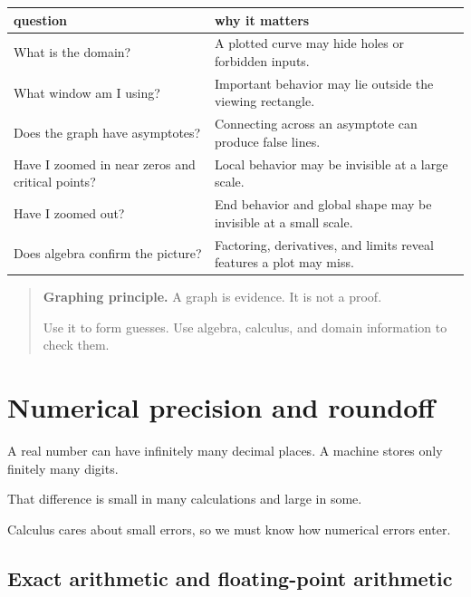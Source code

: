\begin{center}
\renewcommand{\arraystretch}{1.5}
\begin{tabular}{p{}|p{}}
\textbf{question} & \textbf{why it matters} \\ \hline
What is the domain? & A plotted curve may hide holes or forbidden inputs. \\

What window am I using? & Important behavior may lie outside the viewing rectangle. \\

Does the graph have asymptotes? & Connecting across an asymptote can produce false lines. \\

Have I zoomed in near zeros and critical points? & Local behavior may be invisible at a large scale. \\

Have I zoomed out? & End behavior and global shape may be invisible at a small scale. \\

Does algebra confirm the picture? & Factoring, derivatives, and limits reveal features a plot may miss.
\end{tabular}
\end{center}

\begin{quote}
\textbf{Graphing principle.}
A graph is evidence.  It is not a proof.

Use it to form guesses.  Use algebra, calculus, and domain information to check them.
\end{quote}

\section{Numerical precision and roundoff}
\label{appsec:numerical-precision-roundoff}

A real number can have infinitely many decimal places.  A machine stores only finitely
many digits.

That difference is small in many calculations and large in some.

Calculus cares about small errors, so we must know how numerical errors enter.

\subsection{Exact arithmetic and floating-point arithmetic}
\label{appsubsec:exact-and-floating-point}

